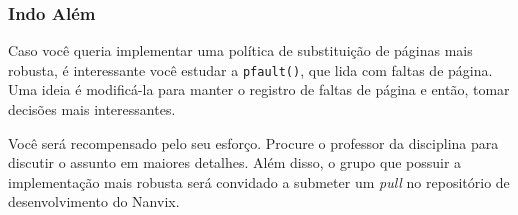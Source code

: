 \documentclass[11pt]{article}
\begin{document}
\subsubsection*{Indo Além}

Caso você queria implementar uma política de substituição de páginas mais robusta, é interessante você estudar a \texttt{pfault()}, que lida com faltas de página. Uma ideia é modificá-la para manter o registro de faltas de página e então, tomar decisões mais interessantes.

Você será recompensado pelo seu esforço. Procure o professor da disciplina para discutir o assunto em maiores detalhes. Além disso, o grupo que possuir a implementação mais robusta será convidado a submeter um \textit{pull} no repositório de desenvolvimento do Nanvix.
\end{document}
